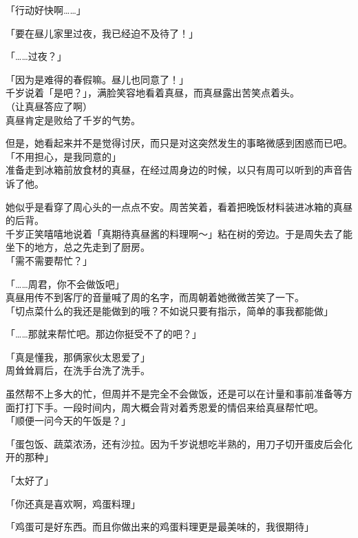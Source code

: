 「行动好快啊……」

「要在昼儿家里过夜，我已经迫不及待了！」

「……过夜？」

「因为是难得的春假嘛。昼儿也同意了！」\\

千岁说着「是吧？」，满脸笑容地看着真昼，而真昼露出苦笑点着头。\\

（让真昼答应了啊）\\

真昼肯定是败给了千岁的气势。

但是，她看起来并不是觉得讨厌，而只是对这突然发生的事略微感到困惑而已吧。\\

「不用担心，是我同意的」\\

准备走到冰箱前放食材的真昼，在经过周身边的时候，以只有周可以听到的声音告诉了他。

她似乎是看穿了周心头的一点点不安。周苦笑着，看着把晚饭材料装进冰箱的真昼的后背。\\

千岁正笑嘻嘻地说着「真期待真昼酱的料理啊～」粘在树的旁边。于是周失去了能坐下的地方，总之先走到了厨房。\\

「需不需要帮忙？」

「……周君，你不会做饭吧」\\

真昼用传不到客厅的音量喊了周的名字，而周朝着她微微苦笑了一下。\\

「切点菜什么的我还是能做到的哦？不如说只要有指示，简单的事我都能做」

「……那就来帮忙吧。那边你挺受不了的吧？」

「真是懂我，那俩家伙太恩爱了」\\

周耸耸肩后，在洗手台洗了洗手。

虽然帮不上多大的忙，但周并不是完全不会做饭，还是可以在计量和事前准备等方面打打下手。一段时间内，周大概会背对着秀恩爱的情侣来给真昼帮忙吧。\\

「顺便一问今天的午饭是？」

「蛋包饭、蔬菜浓汤，还有沙拉。因为千岁说想吃半熟的，用刀子切开蛋皮后会化开的那种」

「太好了」

「你还真是喜欢啊，鸡蛋料理」

「鸡蛋可是好东西。而且你做出来的鸡蛋料理更是最美味的，我很期待」\\

